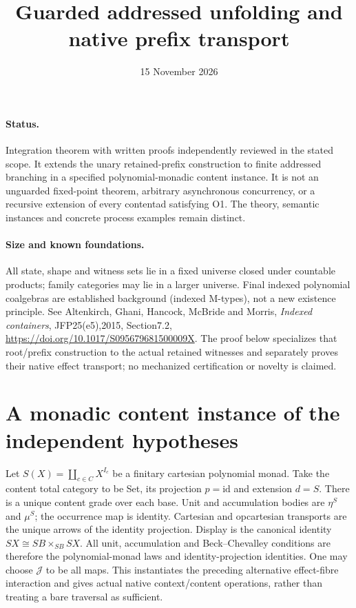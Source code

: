 \documentclass[11pt]{article}
\title{Guarded addressed unfolding and native prefix transport}
\date{15 November 2026}
\begin{document}
\maketitle
\paragraph{Status.} Integration theorem with written proofs independently reviewed in the stated scope. It extends the unary retained-prefix construction to finite addressed branching in a specified polynomial-monadic content instance. It is not an unguarded fixed-point theorem, arbitrary asynchronous concurrency, or a recursive extension of every contentad satisfying O1. The theory, semantic instances and concrete process examples remain distinct.

\paragraph{Size and known foundations.} All state, shape and witness sets lie in a fixed universe closed under countable products; family categories may lie in a larger universe. Final indexed polynomial coalgebras are established background (indexed M-types), not a new existence principle. See Altenkirch, Ghani, Hancock, McBride and Morris, \emph{Indexed containers}, JFP25(e5),2015, Section7.2, \url{https://doi.org/10.1017/S095679681500009X}. The proof below specializes that root/prefix construction to the actual retained witnesses and separately proves their native effect transport; no mechanized certification or novelty is claimed.

\section{A monadic content instance of the independent hypotheses}
Let $S(X)=\coprod_{c\in C}X^{I_c}$ be a finitary cartesian polynomial monad. Take the content total category to be Set, its projection $p=\mathrm{id}$ and extension $d=S$. There is a unique content grade over each base. Unit and accumulation bodies are $\eta^S$ and $\mu^S$; the occurrence map is identity. Cartesian and opcartesian transports are the unique arrows of the identity projection. Display is the canonical identity $SX\cong SB\times_{SB}SX$. All unit, accumulation and Beck--Chevalley conditions are therefore the polynomial-monad laws and identity-projection identities. One may choose $\mathcal J$ to be all maps. This instantiates the preceding alternative effect-fibre interaction and gives actual native context/content operations, rather than treating a bare traversal as sufficient.
\end{document}
